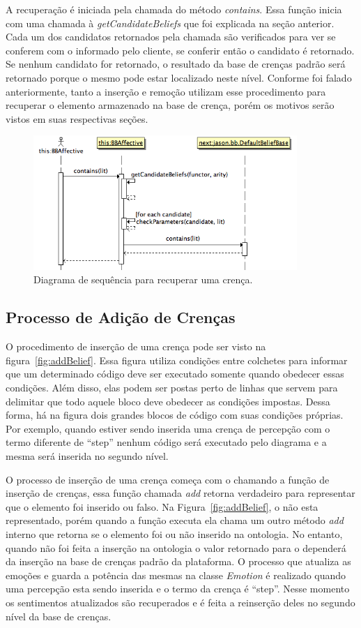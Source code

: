 A recuperação é iniciada pela chamada do método \emph{contains}. Essa função
inicia com uma chamada à \emph{getCandidateBeliefs} que foi explicada na seção anterior.
Cada um dos candidatos retornados pela chamada são verificados para ver se
conferem com o informado pelo cliente, se conferir então o candidato é
retornado. Se nenhum candidato for retornado, o resultado da base de crenças
padrão será retornado porque o mesmo pode estar localizado neste nível.
Conforme foi falado anteriormente, tanto a inserção e remoção utilizam esse
procedimento para recuperar o elemento armazenado na base de crença, porém os
motivos serão vistos em suas respectivas seções.

\begin{figure}
  \centering
  \includegraphics[width=100mm]{figuras/sd-contains.png}
  \caption{Diagrama de sequência para recuperar uma crença.}
  \label{fig:recover}
\end{figure}

\subsection{Processo de Adição de Crenças}

O procedimento de inserção de uma crença pode ser visto na
figura~\ref{fig:addBelief}. Essa figura utiliza condições entre colchetes para
informar que um determinado código deve ser executado somente quando obedecer
essas condições. Além disso, elas podem ser postas perto de linhas que servem
para delimitar que todo aquele bloco deve obedecer as condições impostas.
Dessa forma, há na figura dois grandes blocos de código com suas condições
próprias. Por exemplo, quando estiver sendo inserida uma crença de percepção
com o termo diferente de ``step'' nenhum código será executado pelo diagrama e
a mesma será inserida no segundo nível.

O processo de inserção de uma crença começa com o \jason chamando a função de
inserção de crenças, essa função chamada \emph{add} retorna verdadeiro para
representar que o elemento foi inserido ou falso. Na
Figura~\ref{fig:addBelief}, o \jason não esta representado, porém quando a
função executa ela chama um outro método \emph{add} interno que retorna se o
elemento foi ou não inserido na ontologia. No entanto, quando não foi feita a
inserção na ontologia o valor retornado para o \jason dependerá da inserção na
base de crenças padrão da plataforma. O processo que atualiza as emoções e
guarda a potência das mesmas na classe \emph{Emotion} é realizado quando uma
percepção esta sendo inserida e o termo da crença é ``step''. Nesse momento os
sentimentos atualizados são recuperados e é feita a reinserção deles no
segundo nível da base de crenças.

